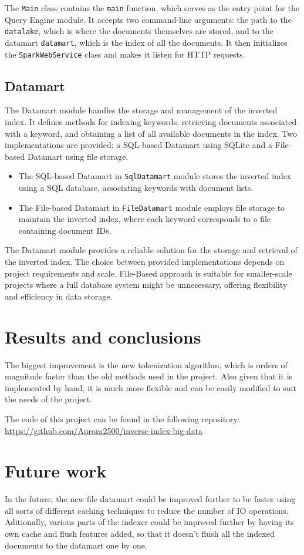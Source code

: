 \documentclass{article}
\begin{document}
The \texttt{Main} class contains the \texttt{main} function, which serves as the entry point for the Query Engine module.
It accepts two command-line arguments: the path to the \texttt{datalake}, which is where the documents themselves are stored, and to the datamart \texttt{datamart}, which is the index of all the documents.
It then initializes the \texttt{SparkWebService} class and makes it listen for HTTP requests.

\subsection{Datamart}

The Datamart module handles the storage and management of the inverted index. It defines methods for indexing keywords, retrieving documents associated with a keyword, and obtaining a list of all available documents in the index. Two implementations are provided: a SQL-based Datamart using SQLite and a File-based Datamart using file storage.
\begin{itemize}

\item 
The SQL-based Datamart in \texttt{SqlDatamart} module stores the inverted index using a SQL database, associating keywords with document lists.

\item 
The File-based Datamart in \texttt{FileDatamart} module employs file storage to maintain the inverted index, where each keyword corresponds to a file containing document IDs. 
\end{itemize}
The Datamart module provides a reliable solution for the storage and retrieval of the inverted index. The choice between provided implementations depends on project requirements and scale.
File-Based approach is suitable for smaller-scale projects where a full database system might be unnecessary, offering flexibility and efficiency in data storage.

\section{Results and conclusions}

The biggest improvement is the new tokenization algorithm, which is orders of magnitude faster than the old methods used in the project.
Also given that it is implemented by hand, it is much more flexible and can be easily modified to suit the needs of the project.

The code of this project can be found in the following repository: \url{https://github.com/Aurora2500/inverse-index-big-data}

\section{Future work}

In the future, the new file datamart could be improved further to be faster using all sorts of different caching techniques to reduce the number of IO operations.
Aditionally, various parts of the indexer could be improved further by having its own cache and flush features added, so that it doesn't flush all the indexed documents to the datamart one by one.
\end{document}
